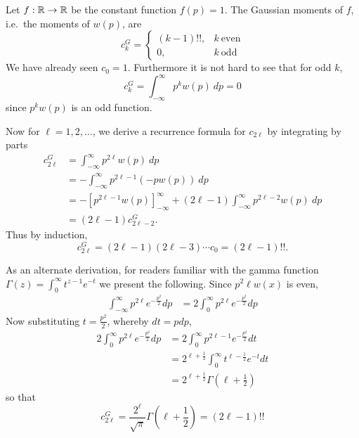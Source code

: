 \begin{myexample}
  Let $f: \mathbb{R} \rightarrow \mathbb{R}$ be the constant function $f(p)=1$. The Gaussian moments of $f$, i.e.\ the moments of $w(p)$, are
  \[
    c^G_k 
    = \begin{cases}
        (k-1)!!, & k~\text{even} \\
        0, & k~\text{odd}
    \end{cases}
  \]
  We have already seen $c_0 = 1$. Furthermore it is not hard to see that for odd $k$, 
  \[
    c^G_k = \int_{-\infty}^\infty p^k w(p) ~dp = 0
  \]
  since $p^k w(p)$ is an odd function.

  Now for $\ell = 1, 2, \ldots$, we derive a recurrence formula for $c_{2\ell}$ by integrating by parts
  \begin{align*}
    c^G_{2\ell}
    &= \int_{-\infty}^\infty p^{2\ell} w(p) ~dp \\
    &= -\int_{-\infty}^\infty p^{2\ell-1} \left(-p w(p)\right) ~dp \\
    &= - \left[p^{2\ell-1} w(p)\right]_{-\infty}^\infty + (2\ell-1)\int_{-\infty}^\infty p^{2\ell-2} w(p) ~dp \\
    &= (2\ell-1)c^G_{2\ell-2}.
  \end{align*}
  Thus by induction,
  \[
    c^G_{2\ell} = (2\ell - 1)(2\ell - 3) \cdots c_0 = (2\ell-1)!!.
  \]

  As an alternate derivation, for readers familiar with the gamma function $\Gamma(z) = \int_0^\infty t^{z-1}e^{-t}$ we present the following. Since $p^2\ell w(x)$ is even,
  \begin{align*}
    \int_{-\infty}^\infty p^{2\ell} e^{-\frac{p^2}2} dp 
      &= 2\int_0^\infty p^{2\ell} e^{-\frac{p^2}2} dp 
  \end{align*}
  Now substituting $t = \frac{p^2}2$, whereby $dt = p dp$,
  \begin{align*}
    2\int_0^\infty p^{2\ell} e^{-\frac{p^2}2} dp 
      &= 2\int_0^\infty p^{2\ell - 1} e^{-\frac{p^2}2} dt \\
      &= 2^{\ell+\frac12}\int_0^\infty t^{\ell - \frac12}e^{-t} dt \\
      &= 2^{\ell+\frac12} \Gamma\left(\ell + \frac12\right)
  \end{align*}
  so that
  \[
    c^G_{2\ell} = \frac{2^{\ell}}{\sqrt{\pi}} \Gamma\left(\ell + \frac12\right) = (2\ell - 1)!!
  \]
\end{myexample}



